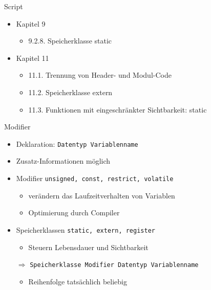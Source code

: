 
\begin{frame}[t,plain]
\titlepage
\end{frame}


\begin{frame}{Script}
%
\begin{itemize}
\item Kapitel 9
	\begin{itemize}
	\item 9.2.8. Speicherklasse static	
	\end{itemize}
\item Kapitel 11
	\begin{itemize}
	\item 11.1. Trennung von Header- und Modul-Code
	\item 11.2. Speicherklasse extern
	\item 11.3. Funktionen mit eingeschränkter Sichtbarkeit: static
	\end{itemize}
\end{itemize}
%
\end{frame}


\begin{frame}[fragile]{Modifier}
%
\begin{itemize}
\item Deklaration: \texttt{Datentyp Variablenname}
\item Zusatz-Informationen möglich
\item Modifier \texttt{unsigned, const, restrict, volatile}
	\begin{itemize}
	\item verändern das Laufzeitverhalten von Variablen
	\item Optimierung durch Compiler
	\end{itemize}
\item Speicherklassen \texttt{static, extern, register}
	\begin{itemize}
	\item Steuern Lebensdauer und Sichtbarkeit
	\end{itemize}
\item[$\Rightarrow$] \texttt{Speicherklasse Modifier Datentyp Variablenname}
	\begin{itemize}
	\item Reihenfolge tatsächlich beliebig
	\end{itemize}
\end{itemize}
%
\end{frame}

